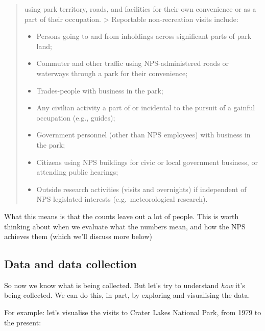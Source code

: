 \documentclass[
  letterpaper,
  DIV=11,
  numbers=noendperiod]{scrartcl}
\providecommand{\tightlist}{%
  \setlength{\itemsep}{0pt}\setlength{\parskip}{0pt}}\usepackage{longtable,booktabs,array}
\begin{document}
\begin{quote}
using park territory, roads, and facilities for their own convenience or
as a part of their occupation. \textgreater{} Reportable non-recreation
visits include:

\begin{itemize}
\tightlist
\item
  Persons going to and from inholdings across significant parts of park
  land;
\item
  Commuter and other traffic using NPS-administered roads or waterways
  through a park for their convenience;
\item
  Trades-people with business in the park;
\item
  Any civilian activity a part of or incidental to the pursuit of a
  gainful occupation (e.g., guides);
\item
  Government personnel (other than NPS employees) with business in the
  park;
\item
  Citizens using NPS buildings for civic or local government business,
  or attending public hearings;
\item
  Outside research activities (visits and overnights) if independent of
  NPS legislated interests (e.g.~meteorological research).
\end{itemize}
\end{quote}

What this means is that the counts leave out a lot of people. This is
worth thinking about when we evaluate what the numbers mean, and how the
NPS achieves them (which we'll discuss more below)

\subsection{Data and data collection}\label{data-and-data-collection}

So now we know what is being collected. But let's try to understand
\emph{how} it's being collected. We can do this, in part, by exploring
and visualising the data.

For example: let's visualise the visits to Crater Lakes National Park,
from 1979 to the present:
\end{document}
